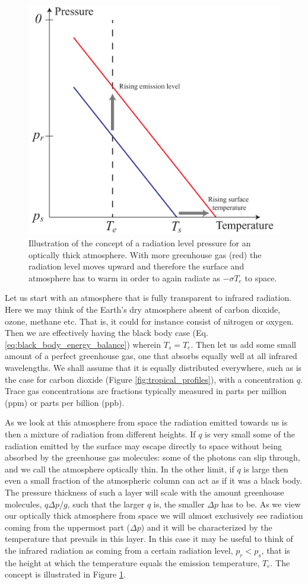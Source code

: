 \documentclass[12pt]{book}
\begin{document}
\begin{figure}
\begin{center}
\includegraphics[width=8 cm]{../illustrations/Gaseous_atmosphere_radiation_level}
\end{center}
\caption{ Illustration of the concept of a radiation level pressure for an optically thick atmosphere. With more greenhouse gas (red) the radiation level moves upward and therefore the surface and atmosphere has to warm in order to again radiate as $-\sigma T_e$ to space.   } 
\label{fig:radiation_level}
\end{figure}

Let us start with an atmosphere that is fully transparent to infrared radiation. Here we may think of the Earth's dry atmosphere absent of carbon dioxide, ozone, methane etc. That is, it could for instance consist of nitrogen or oxygen. Then we are effectively having the black body case (Eq. \ref{eq:black_body_energy_balance}) wherein $T_s = T_e$. Then let us add some small amount of a perfect greenhouse gas, one that absorbs equally well at all infrared wavelengths. We shall assume that it is equally distributed everywhere, such as is the case for carbon dioxide (Figure \ref{fig:tropical_profiles}), with a concentration $q$. Trace gas concentrations are fractions typically measured in parts per million (ppm) or parts per billion (ppb).

As we look at this atmosphere from space the radiation emitted towards us is then  a mixture of radiation from different heights. If $q$ is very small some of the radiation emitted by the surface may escape directly to space without being absorbed by the greenhouse gas molecules: some of the photons can slip through, and we call the atmosphere optically thin. In the other limit, if $q$ is large then even a small fraction of the atmospheric column can act as if it was a black body. The pressure thickness of such a layer will scale with the amount greenhouse molecules, $q \Delta p/g$, such that the larger $q$ is, the smaller $\Delta p$ has to be. As we view our optically thick atmosphere from space we will almost exclusively see radiation coming from the uppermost part ($\Delta p$) and it will be characterized by the temperature that prevails in this layer. In this case it may be useful to think of the infrared radiation as coming from a certain radiation level, $p_r < p_s$, that is the height at which the temperature equals the emission temperature, $T_e$. The concept is illustrated in Figure \ref{fig:radiation_level}.
\end{document}
